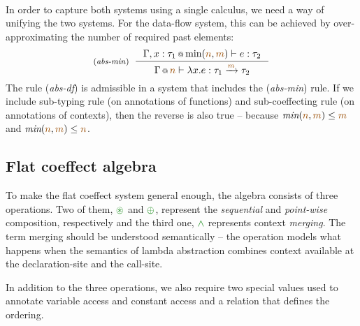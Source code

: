 ~

In order to capture both systems using a single calculus, we need a way of unifying the two
systems. For the data-flow system, this can be achieved by over-approximating the number of 
required past elements:
%
\begin{equation*}
\tyrule{abs-min}
  {\coctx{\Gamma, x:\tau_1}{\textnormal{min}(\aclrd{n}, \aclrd{m})} \vdash e : \tau_2}
  {\coctx{\Gamma}{\aclrd{n}} \vdash \lambda x.e : \tau_1 \xrightarrow{\aclrd{m}} \tau_2 }
\end{equation*}
%
The rule (\emph{abs-df}) is admissible in a system that includes the (\emph{abs-min}) rule. 
If we include sub-typing rule (on annotations of functions) and sub-coeffecting rule (on 
annotations of contexts), then the reverse is also true -- because 
$\textit{min}(\aclrd{n}, \aclrd{m}) \leq \aclrd{m}$ and $\textit{min}(\aclrd{n}, \aclrd{m}) \leq \aclrd{n}$.


\subsection{Flat coeffect algebra}
\label{sec:flat-calculus-algebra}

To make the flat coeffect system general enough, the algebra consists of three operations.
Two of them, $\cseq$ and $\cpar$, represent the \emph{sequential} and \emph{point-wise} composition, 
respectively and the third one, $\czip$ represents context \emph{merging}. The term merging should be 
understood semantically -- the operation models what happens when the semantics of lambda abstraction 
combines context available at the declaration-site and the call-site.

In addition to the three operations, we also require two special values used to annotate
variable access and constant access and a relation that defines the ordering.

